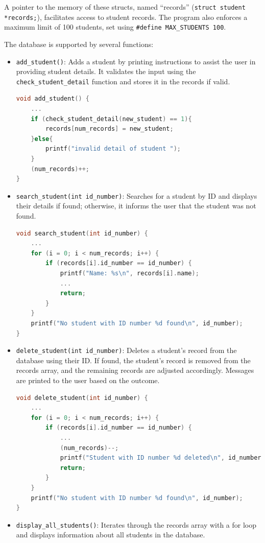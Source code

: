 \documentclass[a4paper, 11pt]{report}
\begin{document}
A pointer to the memory of these structs, named ``records'' (\texttt{struct student *records;}), facilitates access to student records. The program also enforces a maximum limit of 100 students, set using \texttt{\#define MAX\_STUDENTS 100}.

The database is supported by several functions:

\begin{itemize}
\item \texttt{add\_student()}: Adds a student by printing instructions to assist the user in providing student details. It validates the input using the \texttt{check\_student\_detail} function and stores it in the records if valid.
\begin{lstlisting}[language=C]
void add_student() {
    ...
    if (check_student_detail(new_student) == 1){
        records[num_records] = new_student;
    }else{
        printf("invalid detail of student ");
    }
    (num_records)++;
}
\end{lstlisting}

\item \texttt{search\_student(int id\_number)}: Searches for a student by ID and displays their details if found; otherwise, it informs the user that the student was not found.
\begin{lstlisting}[language=C]
void search_student(int id_number) {
    ...
    for (i = 0; i < num_records; i++) {
        if (records[i].id_number == id_number) {
            printf("Name: %s\n", records[i].name);
            ...
            return;
        }
    }
    printf("No student with ID number %d found\n", id_number);
}

\end{lstlisting}


\item \texttt{delete\_student(int id\_number)}: Deletes a student's record from the database using their ID. If found, the student's record is removed from the records array, and the remaining records are adjusted accordingly. Messages are printed to the user based on the outcome.
\begin{lstlisting}[language=C]
void delete_student(int id_number) {
    ...
    for (i = 0; i < num_records; i++) {
        if (records[i].id_number == id_number) {
            ...
            (num_records)--;
            printf("Student with ID number %d deleted\n", id_number);
            return;
        }
    }
    printf("No student with ID number %d found\n", id_number);
}

\end{lstlisting}
\item \texttt{display\_all\_students()}: Iterates through the records array with a for loop and displays information about all students in the database.


\end{itemize}
\end{document}
